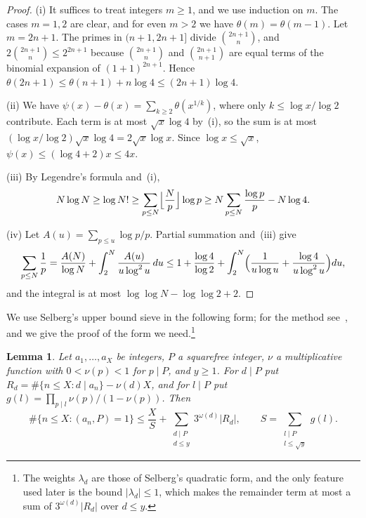 \documentclass{aomart}
\numberwithin{equation}{section}
\newtheorem{lemma}[theorem]{Lemma}
\theoremstyle{definition}
\begin{document}
\begin{proof}
(i) It suffices to treat integers $m\ge1$, and we use induction on $m$. The cases $m=1,2$ are
clear, and for even $m>2$ we have $\theta(m)=\theta(m-1)$. Let $m=2n+1$. The primes in
$(n+1,2n+1]$ divide $\binom{2n+1}n$, and $2\binom{2n+1}n\le2^{2n+1}$ because $\binom{2n+1}n$ and
$\binom{2n+1}{n+1}$ are equal terms of the binomial expansion of $(1+1)^{2n+1}$. Hence
$\theta(2n+1)\le\theta(n+1)+n\log4\le(2n+1)\log4$.

(ii) We have $\psi(x)-\theta(x)=\sum_{k\ge2}\theta(x^{1/k})$, where only $k\le\log x/\log2$
contribute. Each term is at most $\sqrt x\log4$ by~(i), so the sum is at most
$(\log x/\log2)\sqrt x\log4=2\sqrt x\log x$. Since $\log x\le\sqrt x$, $\psi(x)\le(\log4+2)x\le4x$.

(iii) By Legendre's formula and~(i),
\[
  N\log N\ge\log N!\ge\sum_{p\le N}\Bigl\lfloor\frac Np\Bigr\rfloor\log p
  \ge N\sum_{p\le N}\frac{\log p}p-N\log4.
\]

(iv) Let $A(u)=\sum_{p\le u}\log p/p$. Partial summation and~(iii) give
\[
  \sum_{p\le N}\frac1p=\frac{A(N)}{\log N}+\int_2^N\frac{A(u)}{u\log^2u}\,du
  \le1+\frac{\log4}{\log2}+\int_2^N\Bigl(\frac1{u\log u}+\frac{\log4}{u\log^2u}\Bigr)du,
\]
and the integral is at most $\log\log N-\log\log2+2$.
\end{proof}

We use Selberg's upper bound sieve in the following form; for the method
see~\cite[Chapter~3]{HR74}, and we give the proof of the form we need.\footnote{The weights
$\lambda_d$ are those of Selberg's quadratic form, and the only feature used later is the bound
$|\lambda_d|\le1$, which makes the remainder term at most a sum of $3^{\omega(d)}|R_d|$ over
$d\le y$.}

\begin{lemma}\label{lem:selberg}
Let $a_1,\dots,a_X$ be integers, $P$ a squarefree integer, $\nu$ a multiplicative function with
$0<\nu(p)<1$ for $p\mid P$, and $y\ge1$. For $d\mid P$ put
$R_d=\#\{n\le X:d\mid a_n\}-\nu(d)X$, and for $l\mid P$ put
$g(l)=\prod_{p\mid l}\nu(p)/(1-\nu(p))$. Then
\[
  \#\{n\le X:(a_n,P)=1\}\le\frac XS+\sum_{\substack{d\mid P\\d\le y}}3^{\omega(d)}|R_d|,
  \qquad S=\sum_{\substack{l\mid P\\l\le\sqrt y}}g(l).
\]
\end{lemma}
\end{document}

